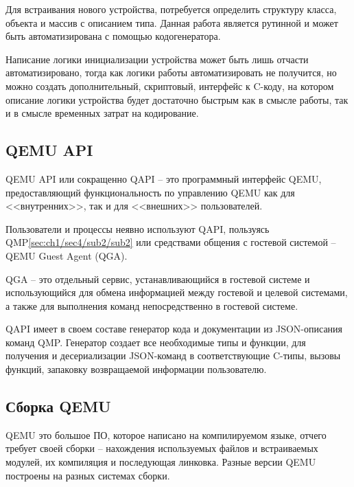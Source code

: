 Для встраивания нового устройства, потребуется определить структуру класса, объекта и массив с описанием
типа. Данная работа является рутинной и может быть автоматизирована с помощью кодогенератора.

Написание логики инициализации устройства может быть лишь отчасти автоматизировано, тогда как
логики работы автоматизировать не получится, но можно создать дополнительный, скриптовый,
интерфейс к C-коду, на котором описание логики устройства будет достаточно быстрым как
в смысле работы, так и в смысле временных затрат на кодирование.


\subsection{QEMU API}\label{sec:ch1/sec4/sub3/sub5}

QEMU API или сокращенно QAPI -- это программный интерфейс QEMU, предоставляющий функциональность по
управлению QEMU как для <<внутренних>>, так и для <<внешних>> пользователей.

Пользователи и процессы неявно используют QAPI, пользуясь QMP\cref{sec:ch1/sec4/sub2/sub2} или средствами
общения с гостевой системой -- QEMU Guest Agent (QGA).

QGA -- это отдельный сервис, устанавливающийся в гостевой системе и использующийся для обмена информацией
между гостевой и целевой системами, а также для выполнения команд непосредственно в гостевой системе.

QAPI имеет в своем составе генератор кода и документации из JSON-описания команд QMP.
Генератор создает все необходимые типы и функции, для получения и десериализации JSON-команд в соответствующие
C-типы, вызовы функций, запаковку возвращаемой информации пользователю.

\subsection{Сборка QEMU}\label{sec:ch1/sec4/sub2/sub6}

QEMU это большое ПО, которое написано на компилируемом языке, отчего требует
своей сборки -- нахождения используемых файлов и встраиваемых модулей,
их компиляция и последующая линковка. Разные версии QEMU построены на разных
системах сборки.


